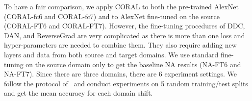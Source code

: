 \documentclass[letterpaper]{article}
\begin{document}
To have a fair comparison, we apply CORAL to both the pre-trained AlexNet (CORAL-fc6 and CORAL-fc7) and to AlexNet fine-tuned on the source (CORAL-FT6 and CORAL-FT7). However, the fine-tuning procedures of DDC, DAN, and ReverseGrad are very complicated as there is more than one loss and hyper-parameters are needed to combine them. They also require adding new layers and data from both source and target domains. We use standard fine-tuning on the source domain only to get the baseline NA results (NA-FT6 and NA-FT7). Since there are three domains, there are 6 experiment settings. We follow the protocol of~\cite{decaf,tzeng_arxiv15,reversegrad} and conduct experiments on 5 random training/test splits and get the mean accuracy for each domain shift. 

\begin{table}[t]
\begin{center}
\end{center}
\end{table}
\end{document}

